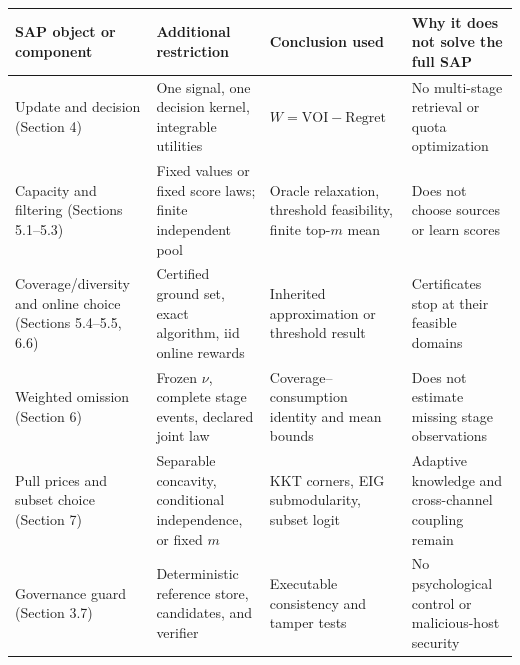 \documentclass[
  11pt]{article}
\begin{document}
\begin{longtable}[]{@{}
  >{\raggedright\arraybackslash}p{}
  >{\raggedright\arraybackslash}p{}
  >{\raggedright\arraybackslash}p{}
  >{\raggedright\arraybackslash}p{}@{}}
\toprule\noalign{}
\begin{minipage}[b]{\linewidth}\raggedright
SAP object or component
\end{minipage} & \begin{minipage}[b]{\linewidth}\raggedright
Additional restriction
\end{minipage} & \begin{minipage}[b]{\linewidth}\raggedright
Conclusion used
\end{minipage} & \begin{minipage}[b]{\linewidth}\raggedright
Why it does not solve the full SAP
\end{minipage} \\
\midrule\noalign{}
\endhead
\bottomrule\noalign{}
\endlastfoot
Update and decision (Section 4) & One signal, one decision kernel,
integrable utilities & \(W=\mathrm{VOI}-\mathrm{Regret}\) & No
multi-stage retrieval or quota optimization \\
Capacity and filtering (Sections 5.1--5.3) & Fixed values or fixed score
laws; finite independent pool & Oracle relaxation, threshold
feasibility, finite top-\(m\) mean & Does not choose sources or learn
scores \\
Coverage/diversity and online choice (Sections 5.4--5.5, 6.6) &
Certified ground set, exact algorithm, iid online rewards & Inherited
approximation or threshold result & Certificates stop at their feasible
domains \\
Weighted omission (Section 6) & Frozen \(\nu\), complete stage events,
declared joint law & Coverage--consumption identity and mean bounds &
Does not estimate missing stage observations \\
Pull prices and subset choice (Section 7) & Separable concavity,
conditional independence, or fixed \(m\) & KKT corners, EIG
submodularity, subset logit & Adaptive knowledge and cross-channel
coupling remain \\
Governance guard (Section 3.7) & Deterministic reference store,
candidates, and verifier & Executable consistency and tamper tests & No
psychological control or malicious-host security \\
\end{longtable}
\end{document}
